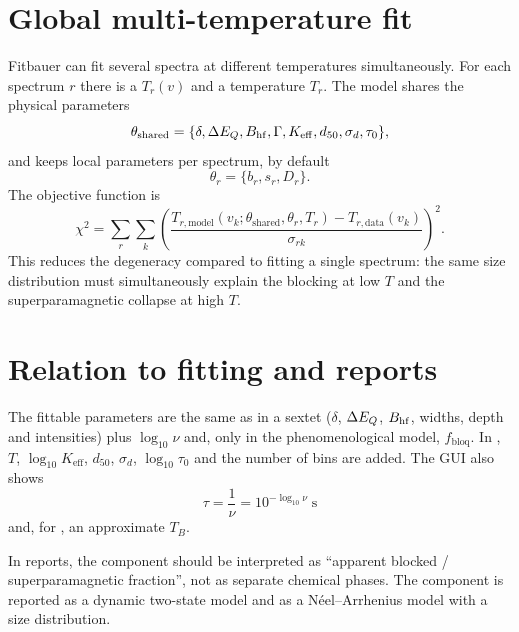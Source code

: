 \section{Global multi-temperature fit}

Fitbauer can fit several spectra at different temperatures simultaneously. For each
spectrum $r$ there is a $T_r(v)$ and a temperature $T_r$. The model shares the
physical parameters
\begin{equation}
  \theta_{\mathrm{shared}}=\{\delta,\Delta E_{Q},B_{\mathrm{hf}},\Gamma,K_{\mathrm{eff}},d_{50},
  \sigma_d,\tau_0\},
\end{equation}
and keeps local parameters per spectrum, by default
\begin{equation}
  \theta_r=\{b_r,s_r,D_r\}.
\end{equation}
The objective function is
\begin{equation}
  \chi^2=\sum_r\sum_k
  \left(\frac{T_{r,\mathrm{model}}(v_k;\theta_{\mathrm{shared}},\theta_r,T_r)
  -T_{r,\mathrm{data}}(v_k)}{\sigma_{rk}}\right)^2.
\end{equation}
This reduces the degeneracy compared to fitting a single spectrum: the same size
distribution must simultaneously explain the blocking at low $T$ and the
superparamagnetic collapse at high $T$.

\section{Relation to fitting and reports}

The fittable parameters are the same as in a sextet ($\delta$, $\Delta E_{Q}$, $B_{\mathrm{hf}}$,
widths, depth and intensities) plus $\log_{10}\nu$ and, only in the
phenomenological model, $f_{\mathrm{bloq}}$. In , $T$,
$\log_{10}K_{\mathrm{eff}}$, $d_{50}$, $\sigma_d$, $\log_{10}\tau_0$ and the number
of bins are added. The GUI also shows
\begin{equation}
  \tau=\frac{1}{\nu}=10^{-\log_{10}\nu}\;\mathrm{s}
\end{equation}
and, for , an approximate $T_B$.

In reports, the  component should be interpreted as ``apparent
blocked / superparamagnetic fraction'', not as separate chemical phases. The
 component is reported as a dynamic two-state model and
 as a Néel--Arrhenius model with a size distribution.

